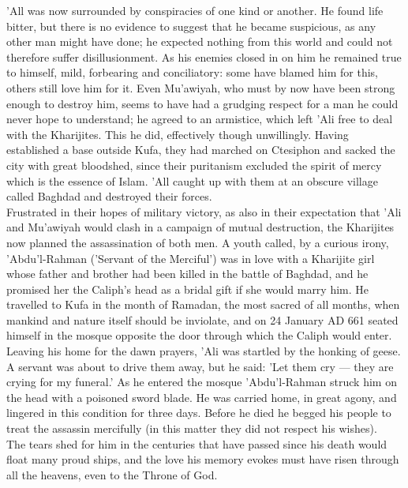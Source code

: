 \documentclass[10pt, twoside,openright]{book}
\begin{document}
'All was now surrounded by conspiracies of one kind or another. He found life bitter, but there is no evidence to suggest that he became suspicious, as any other man might have done; he expected nothing from this world and could not therefore suffer disillusionment. As his enemies closed in on him he remained true to himself, mild, forbearing and conciliatory: some have blamed him for this, others still love him for it. Even Mu'awiyah, who must by now have been strong enough to destroy him, seems to have had a grudging respect for a man he could never hope to understand; he agreed to an armistice, which left 'Ali free to deal with the Kharijites. This he did, effectively though unwillingly. Having established a base outside Kufa, they had marched on Ctesiphon and sacked the city with great bloodshed, since their puritanism excluded the spirit of mercy which is the essence of Islam. 'All caught up with them at an obscure village called Baghdad and destroyed their forces. \\

Frustrated in their hopes of military victory, as also in their expectation that 'Ali and Mu'awiyah would clash in a campaign of mutual destruction, the Kharijites now planned the assassination of both men. A youth called, by a curious irony, 'Abdu'l\hyp{}Rahman ('Servant of the Merciful') was in love with a Kharijite girl whose father and brother had been killed in the battle of Baghdad, and he promised her the Caliph's head as a bridal gift if she would marry him. He travelled to Kufa in the month of Ramadan, the most sacred of all months, when mankind and nature itself should be inviolate, and on 24 January AD 661 seated himself in the mosque opposite the door through which the Caliph would enter. \\

Leaving his home for the dawn prayers, 'Ali was startled by the honking of geese. A servant was about to drive them away, but he said: 'Let them cry --- they are crying for my funeral.' As he entered the mosque 'Abdu'l\hyp{}Rahman struck him on the head with a poisoned sword blade. He was carried home, in great agony, and lingered in this condition for three days. Before he died he begged his people to treat the assassin mercifully (in this matter they did not respect his wishes). \\

The tears shed for him in the centuries that have passed since his death would float many proud ships, and the love his memory evokes must have risen through all the heavens, even to the Throne of God. \\
\end{document}
